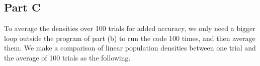 \documentclass{article}
\begin{document}
\begin{figure}[!ht]
	\centering
\end{figure}
\clearpage
\subsection{Part C}
\quad To average the densities over 100 trials for added accuracy, we only need a bigger loop outside the program of part (b) to run the code 100 times, and then average them. We make a comparison of linear population densities between one trial and the average of 100 trials as the following.
\begin{figure}[!ht]
	\centering
\end{figure}
\end{document}

